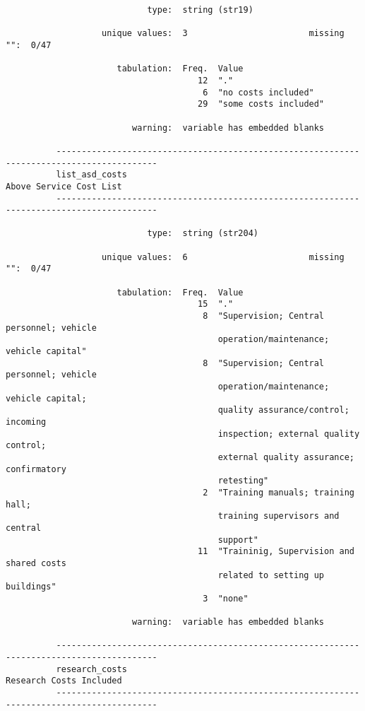 \documentclass{article}
\begin{document}
\begin{verbatim}
                            type:  string (str19)
          
                   unique values:  3                        missing "":  0/47
          
                      tabulation:  Freq.  Value
                                      12  "."
                                       6  "no costs included"
                                      29  "some costs included"
          
                         warning:  variable has embedded blanks
          
          ------------------------------------------------------------------------------------------
          list_asd_costs                                                     Above Service Cost List
          ------------------------------------------------------------------------------------------
          
                            type:  string (str204)
          
                   unique values:  6                        missing "":  0/47
          
                      tabulation:  Freq.  Value
                                      15  "."
                                       8  "Supervision; Central personnel; vehicle
                                          operation/maintenance; vehicle capital"
                                       8  "Supervision; Central personnel; vehicle
                                          operation/maintenance; vehicle capital;
                                          quality assurance/control; incoming
                                          inspection; external quality control;
                                          external quality assurance; confirmatory
                                          retesting"
                                       2  "Training manuals; training hall;
                                          training supervisors and central
                                          support"
                                      11  "Traininig, Supervision and shared costs
                                          related to setting up buildings"
                                       3  "none"
          
                         warning:  variable has embedded blanks
          
          ------------------------------------------------------------------------------------------
          research_costs                                                     Research Costs Included
          ------------------------------------------------------------------------------------------
          

\end{verbatim}
\end{document}
